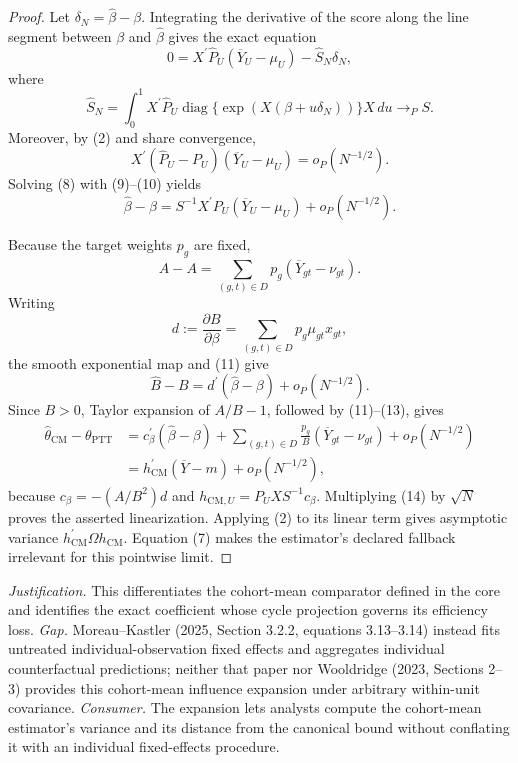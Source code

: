 \documentclass{article}
\begin{document}
\begin{proof}
Let \(\delta_N=\widehat\beta-\beta\).  Integrating the derivative of the score along the line segment between \(\beta\) and \(\widehat\beta\) gives the exact equation
\[
0=X^{\prime}\widehat P_U(\overline Y_U-\mu_U)-\widehat S_N\delta_N,    \tag{8}
\]
where
\[
\widehat S_N
=\int_0^1X^{\prime}\widehat P_U
 \operatorname{diag}\{\exp(X(\beta+u\delta_N))\}X\,du
\to_PS.                                                                \tag{9}
\]
Moreover, by (2) and share convergence,
\[
X^{\prime}(\widehat P_U-P_U)(\overline Y_U-\mu_U)
=o_P(N^{-1/2}).                                                         \tag{10}
\]
Solving (8) with (9)--(10) yields
\[
\widehat\beta-\beta
=S^{-1}X^{\prime}P_U(\overline Y_U-\mu_U)+o_P(N^{-1/2}).                \tag{11}
\]

Because the target weights \(p_g\) are fixed,
\[
\widehat A-A
=\sum_{(g,t)\in D}p_g(\overline Y_{gt}-\nu_{gt}).                      \tag{12}
\]
Writing
\[
d:=\frac{\partial B}{\partial\beta}
=\sum_{(g,t)\in D}p_g\mu_{gt}x_{gt},
\]
the smooth exponential map and (11) give
\[
\widehat B-B=d^{\prime}(\widehat\beta-\beta)+o_P(N^{-1/2}).            \tag{13}
\]
Since \(B>0\), Taylor expansion of \(A/B-1\), followed by (11)--(13), gives
\[
\begin{aligned}
\widehat\theta_{\mathrm{CM}}-\theta_{\mathrm{PTT}}
&=c_\beta^{\prime}(\widehat\beta-\beta)
 +\sum_{(g,t)\in D}\frac{p_g}{B}(\overline Y_{gt}-\nu_{gt})
 +o_P(N^{-1/2})\\
&=h_{\mathrm{CM}}^{\prime}(\overline Y-m)+o_P(N^{-1/2}),               \tag{14}
\end{aligned}
\]
because \(c_\beta=-(A/B^2)d\) and
\(h_{\mathrm{CM},U}=P_UXS^{-1}c_\beta\).  Multiplying (14) by \(\sqrt N\) proves the asserted linearization.  Applying (2) to its linear term gives asymptotic variance
\(h_{\mathrm{CM}}^{\prime}\Omega h_{\mathrm{CM}}\).  Equation (7) makes the estimator's declared fallback irrelevant for this pointwise limit.
\end{proof}
\par\smallskip\noindent \textit{Justification.} This differentiates the cohort-mean comparator defined in the core and identifies the exact coefficient whose cycle projection governs its efficiency loss. \textit{Gap.} Moreau--Kastler (2025, Section 3.2.2, equations 3.13--3.14) instead fits untreated individual-observation fixed effects and aggregates individual counterfactual predictions; neither that paper nor Wooldridge (2023, Sections 2--3) provides this cohort-mean influence expansion under arbitrary within-unit covariance. \textit{Consumer.} The expansion lets analysts compute the cohort-mean estimator's variance and its distance from the canonical bound without conflating it with an individual fixed-effects procedure.
\end{document}
